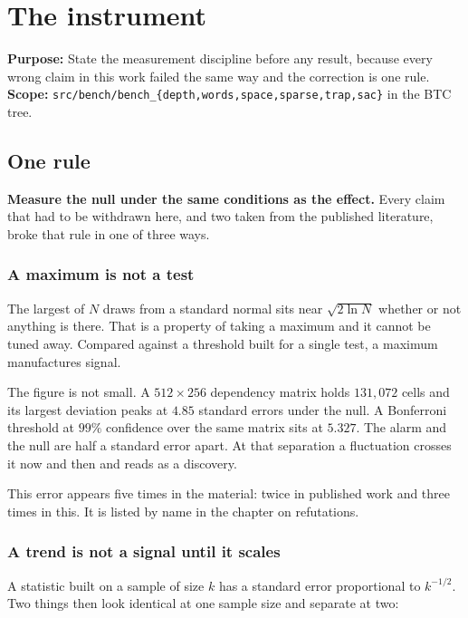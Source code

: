 \chapter{The instrument}

\textbf{Purpose:} State the measurement discipline before any result, because every wrong claim in this work failed the same way and the correction is one rule. \textbf{Scope:} \texttt{src/\allowbreak{}bench/\allowbreak{}bench\_\allowbreak{}\{depth,words,space,sparse,trap,sac\}} in the BTC tree.

\section{One rule}

\textbf{Measure the null under the same conditions as the effect.} Every claim that had to be withdrawn here, and two taken from the published literature, broke that rule in one of three ways.

\subsection{A maximum is not a test}

The largest of \(N\) draws from a standard normal sits near \(\sqrt{2 \ln N}\) whether or not anything is there. That is a property of taking a maximum and it cannot be tuned away. Compared against a threshold built for a single test, a maximum manufactures signal.

The figure is not small. A \(512 \times 256\) dependency matrix holds \(131{,}072\) cells and its largest deviation peaks at \(4.85\) standard errors under the null. A Bonferroni threshold at \(99\%\) confidence over the same matrix sits at \(5.327\). The alarm and the null are half a standard error apart. At that separation a fluctuation crosses it now and then and reads as a discovery.

This error appears five times in the material: twice in published work and three times in this. It is listed by name in the chapter on refutations.

\subsection{A trend is not a signal until it scales}

A statistic built on a sample of size \(k\) has a standard error proportional to \(k^{-1/2}\). Two things then look identical at one sample size and separate at two:

